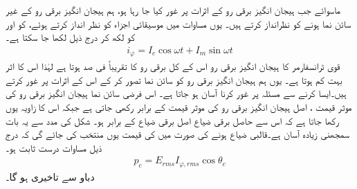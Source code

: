 ماسوائے جب  ہیجان انگیز برقی رو کے اثرات پر غور کیا جا رہا ہو، ہم ہیجان انگیز برقی رو کے غیر سائن نما ہونے کو نظرانداز کرتے ہیں۔ یوں  مساوات  میں  موسیقائی اجزاء کو نظر انداز کرتے ہوئے،  کو  اور  کو  لکھ کر درج ذیل لکھا جا سکتا ہے۔
\begin{align*}
i_{\varphi}=I_c\cos \omega t+I_m\sin \omega t
\end{align*}
 قوی ٹرانسفارمر کا  ہیجان انگیز برقی رو اس کے کل برقی رو کا تقریباً   فی صد  ہوتا ہے  لہٰذا  اس کا اثر بہت کم ہوتا ہے۔ یوں ہم  ہیجان انگیز برقی رو کو سائن نما تصور کر کے اس کے اثرات پر غور کرتے ہیں۔ایسا کرنے سے مسئلہ پر غور کرنا آسان ہو جاتا ہے۔ اس فرضی سائن نما  ہیجان انگیز برقی رو   کی موثر قیمت  ، اصل  ہیجان انگیز برقی رو کی موثر قیمت کے برابر رکھی جاتی ہے جبکہ اس کا زاویہ  یوں رکھا جاتا ہے کہ اس سے حاصل برقی ضیاع اصل برقی ضیاع کے برابر ہو۔ شکل   کی مدد سے یہ بات سمجھنی زیادہ آسان ہے۔قالبی ضیاع  ہونے کی صورت میں  کی قیمت یوں منتخب کی جائے گی کہ درج ذیل مساوات درست ثابت ہو۔
\begin{align}
p_c=E_{rms} I_{\varphi,rms} \cos \theta_c
\end{align}
 دباو   سے   تاخیری ہو گا۔

